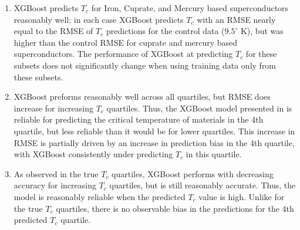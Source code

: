 \documentclass[oneside,12pt]{amsart}
\begin{document}
 \begin{enumerate}
     \item XGBoost predicts $T_c$ for Iron, Cuprate, and Mercury based superconductors reasonably well; in each case XGBoost predicts $T_c$ with an RMSE nearly equal to the RMSE of $T_c$ predictions for the control data ($9.5^\circ$ K), but was higher than the control RMSE for cuprate and mercury based superconductors. The performance of XGBoost at predicting $T_c$ for these subsets does not significantly change when using training data only from these subsets.
     \item XGBoost preforms reasonably well across all quartiles, but RMSE does increase for increasing $T_c$ quartiles. Thus, the XGBoost model presented in \cite{hamidieh_data-driven_2018} is reliable for predicting the critical temperature of materials in the 4th quartile, but less reliable than it would be for lower quartiles. This increase in RMSE is partially driven by an increase in prediction bias in the 4th quartile, with XGBoost consistently under predicting $T_c$ in this quartile.
     \item As observed in the true $T_c$ quartiles, XGBoost performs with decreasing accuracy for increasing $T_c$ quartiles, but is still reasonably accurate. Thus, the model is reasonably reliable when the predicted $T_c$ value is high. Unlike for the true $T_c$ quartiles, there is no observable bias in the predictions for the 4th predicted $T_c$ quartile.
 \end{enumerate}
 
\newpage
\printbibliography
\end{document}
